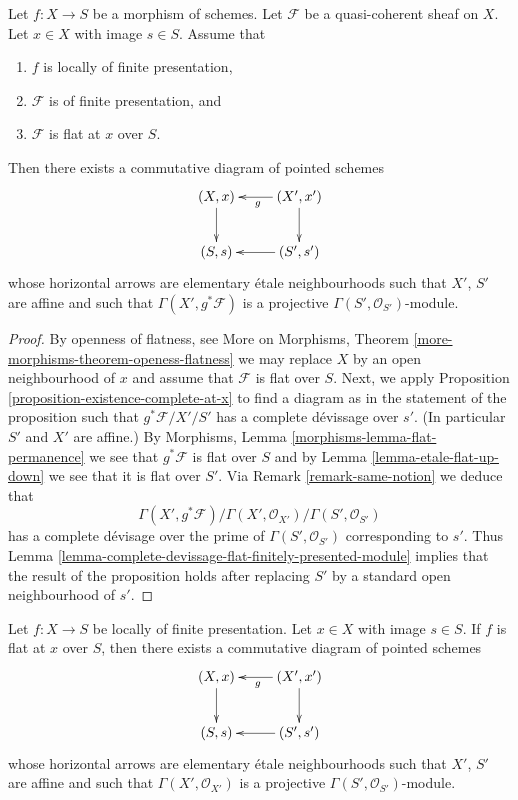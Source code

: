 \begin{proposition}
\label{proposition-finite-presentation-flat-at-point}
Let $f : X \to S$ be a morphism of schemes.
Let $\mathcal{F}$ be a quasi-coherent sheaf on $X$.
Let $x \in X$ with image $s \in S$.
Assume that
\begin{enumerate}
\item $f$ is locally of finite presentation,
\item $\mathcal{F}$ is of finite presentation, and
\item $\mathcal{F}$ is flat at $x$ over $S$.
\end{enumerate}
Then there exists a commutative diagram of pointed schemes
$$
\xymatrix{
(X, x) \ar[d] & (X', x') \ar[l]^g \ar[d] \\
(S, s) & (S', s') \ar[l]
}
$$
whose horizontal arrows are elementary \'etale neighbourhoods
such that $X'$, $S'$ are affine and such that
$\Gamma(X', g^*\mathcal{F})$ is a projective
$\Gamma(S', \mathcal{O}_{S'})$-module.
\end{proposition}

\begin{proof}
By openness of flatness, see
More on Morphisms, Theorem \ref{more-morphisms-theorem-openess-flatness}
we may replace $X$ by an open neighbourhood of $x$ and assume that
$\mathcal{F}$ is flat over $S$. Next, we apply
Proposition \ref{proposition-existence-complete-at-x}
to find a diagram as in the statement of the proposition such
that $g^*\mathcal{F}/X'/S'$ has a complete d\'evissage over $s'$.
(In particular $S'$ and $X'$ are affine.) By
Morphisms, Lemma \ref{morphisms-lemma-flat-permanence}
we see that $g^*\mathcal{F}$ is flat over $S$ and by
Lemma \ref{lemma-etale-flat-up-down}
we see that it is flat over $S'$. Via
Remark \ref{remark-same-notion}
we deduce that
$$
\Gamma(X', g^*\mathcal{F})/
\Gamma(X', \mathcal{O}_{X'})/
\Gamma(S', \mathcal{O}_{S'})
$$
has a complete d\'evisage over the prime of $\Gamma(S', \mathcal{O}_{S'})$
corresponding to $s'$. Thus
Lemma \ref{lemma-complete-devissage-flat-finitely-presented-module}
implies that the result of the proposition holds after replacing
$S'$ by a standard open neighbourhood of $s'$.
\end{proof}

\begin{lemma}
\label{lemma-finite-presentation-flat-at-point-X}
Let $f : X \to S$ be locally of finite presentation.
Let $x \in X$ with image $s \in S$.
If $f$ is flat at $x$ over $S$, then there exists a commutative
diagram of pointed schemes
$$
\xymatrix{
(X, x) \ar[d] & (X', x') \ar[l]^g \ar[d] \\
(S, s) & (S', s') \ar[l]
}
$$
whose horizontal arrows are elementary \'etale neighbourhoods
such that $X'$, $S'$ are affine and such that
$\Gamma(X', \mathcal{O}_{X'})$ is a projective
$\Gamma(S', \mathcal{O}_{S'})$-module.
\end{lemma}

